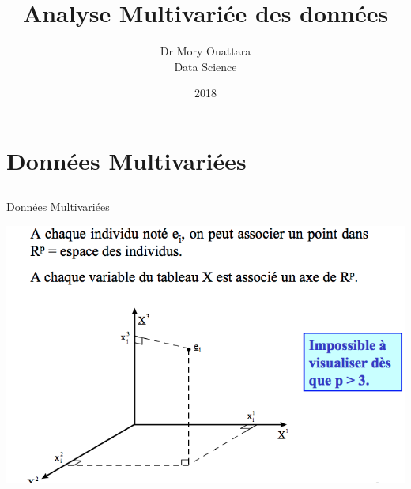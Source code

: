 \documentclass[12pt]{beamer}
\author{Dr Mory Ouattara\\  Data Science }
\title{Analyse Multivariée des données}
\institute{INPHB}
\date{2018}
\begin{document}
\begin{frame}
\titlepage
\end{frame}

\begin{frame}
\tableofcontents
\end{frame}

\section{Données Multivariées}

\subsection{ }





\begin{frame}{Données Multivariées}

  
\centering 
 \includegraphics[scale=0.45]{Proj1.png} 
 

\end{frame}
\end{document}
